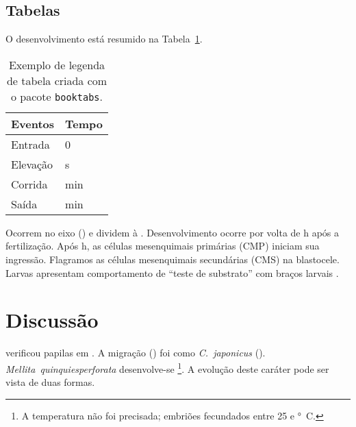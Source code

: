 \subsection{Tabelas}\label{cap2:res:tabs}

O desenvolvimento está resumido na Tabela~\ref{tab:exemplo}.

\begin{table}[htbp]
  \caption[Tabela com \texttt{booktabs}]{Exemplo de legenda de tabela criada com o pacote \texttt{booktabs}.}
  \label{tab:exemplo}
  \vspace{1em}
  \centering
  \begin{tabular}{l l}
    \toprule
    Eventos		&	Tempo\\
    \midrule
    Entrada		&	0\\
    Elevação		&	\unit[40]{s}\\
    Corrida		&	\unit[6]{min}\\
    Saída		&	\unit[15]{min}\\
    \bottomrule
  \end{tabular}
\end{table}

Ocorrem no eixo  () e dividem à .
Desenvolvimento ocorre por volta de \unit[7,5]{h} após a fertilização.
Após \unit[10]{h}, as células mesenquimais primárias (CMP) iniciam sua ingressão.%
Flagramos as células mesenquimais secundárias (CMS) na blastocele.%
Larvas apresentam comportamento de ``teste de substrato'' com braços larvais \citep[][pg.~430]{Hyman1955}.

\section{Discussão}\label{cap2:disc}

\citet{Chia1977} verificou papilas em \subdeshort.
A migração () foi como \emph{C.~japonicus} ().
\emph{Mellita~quinquiesperforata} desenvolve-se \citep{Caldwell1972}\footnote{A temperatura não foi precisada; embriões fecundados entre 25 e \unit[28]{°C}.}.
A evolução deste caráter pode ser vista de duas formas.

